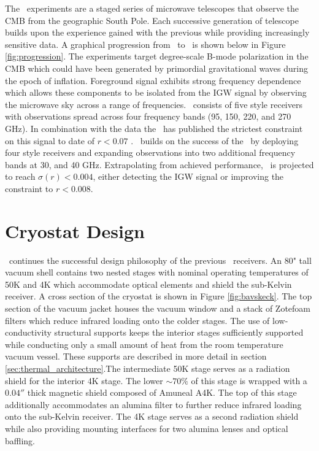 \documentclass[]{spie}  %
\begin{document}
The \bk\ experiments are a staged series of microwave telescopes that observe
the CMB from the geographic South Pole. Each successive generation of
telescope builds upon the experience gained with the previous while providing
increasingly sensitive data. A graphical progression from \ to
\biceparray\ is shown below in Figure \ref{fig:progression}. The experiments target degree-scale B-mode
polarization in the CMB which could have been generated by primordial
gravitational waves during the epoch of inflation. Foreground signal exhibits strong frequency dependence which allows these components to be isolated from the IGW
signal by observing the microwave sky across a range of frequencies.
\keckarray\ consists of five  style receivers with observations spread
across four frequency bands (95, 150, 220, and 270 GHz). In combination with the  data the \keckarray\ has
published the strictest constraint on this signal to date of $r<0.07$
\cite{bk14}. \biceparray\ builds on the success of the \keckarray\ by
deploying four  style receivers and expanding observations into two
additional frequency bands at 30, and 40 GHz. Extrapolating from achieved performance,
\biceparray\ is projected to reach $\sigma(r)<0.004$, either detecting the IGW
signal or improving the constraint to $r<0.008$. 



	
\section{Cryostat Design}

\biceparray\ continues the successful design philosophy of
the previous \bk\ receivers. An 80" tall vacuum shell contains two nested
stages with nominal operating temperatures of 50K and 4K which accommodate
optical elements and shield the sub-Kelvin receiver. A cross section of
the cryostat is shown in Figure \ref{fig:bavskeck}. The top section of the
vacuum jacket houses the vacuum window and a stack of Zotefoam filters which reduce infrared loading
onto the colder stages. The use of low-conductivity structural supports keeps
the interior stages sufficiently supported while conducting only a small
amount of heat from the room temperature vacuum vessel. These supports are
described in more detail in section \ref{sec:thermal_architecture}.The
intermediate 50K stage serves as a radiation shield for the interior 4K stage.
The lower $\sim70\%$ of this stage is wrapped with a $0.04''$ thick magnetic
shield composed of Amuneal A4K. The top of this stage additionally
accommodates an alumina filter to further reduce infrared loading onto the
sub-Kelvin receiver. The 4K stage serves as a second radiation shield while
also providing mounting interfaces for two alumina lenses and optical
baffling.
\end{document}
